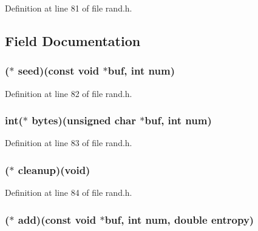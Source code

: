 Definition at line 81 of file rand.\+h.



\subsection{Field Documentation}
\subsubsection[{\texorpdfstring{seed}{seed}}]{($\ast$ seed)(const {\bf void} $\ast$buf, int {\bf num})}\hypertarget{structrand__meth__st_a8bb5aef25587a1d79943612b7d609df7}{}\label{structrand__meth__st_a8bb5aef25587a1d79943612b7d609df7}


Definition at line 82 of file rand.\+h.

\subsubsection[{\texorpdfstring{bytes}{bytes}}]{\setlength{\rightskip}{0pt plus 5cm}int($\ast$ bytes)(unsigned char $\ast$buf, int {\bf num})}\hypertarget{structrand__meth__st_ae936ddc5556cb5c59453d62ab054172e}{}\label{structrand__meth__st_ae936ddc5556cb5c59453d62ab054172e}


Definition at line 83 of file rand.\+h.

\subsubsection[{\texorpdfstring{cleanup}{cleanup}}]{($\ast$ cleanup)({\bf void})}\hypertarget{structrand__meth__st_a8e1ba7348775abcd3cd56ec6f718bea0}{}\label{structrand__meth__st_a8e1ba7348775abcd3cd56ec6f718bea0}


Definition at line 84 of file rand.\+h.

\subsubsection[{\texorpdfstring{add}{add}}]{($\ast$ add)(const {\bf void} $\ast$buf, int {\bf num}, double entropy)}\hypertarget{structrand__meth__st_a9c2e95483d7f1f77ac21ff74a2a28f17}{}\label{structrand__meth__st_a9c2e95483d7f1f77ac21ff74a2a28f17}


